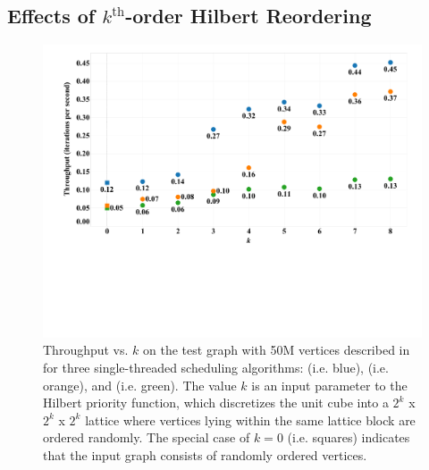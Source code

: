 \subsection{Effects of $k^\textrm{th}$-order Hilbert Reordering}
\label{sec:hilbert_bits}

\begin{figure}[h]
\centering
\includegraphics[width=5in,clip,trim=1cm 6cm 0 0]{figures/scalability_hilbert_bits_serial.pdf}
\caption{Throughput vs. $k$ on the 
test graph with 50M vertices described in 
for three single-threaded scheduling algorithms:  (i.e. blue), 
 (i.e. orange), and  (i.e. green).
The value $k$ is an input parameter to the Hilbert 
priority function, which discretizes the unit cube into
a $2^k$ x $2^k$ x $2^k$ lattice where vertices lying within
the same lattice block are ordered randomly.  The
special case of $k=0$ (i.e. squares) indicates that the input 
graph consists of randomly ordered vertices.
}
\label{fig:scalability_hilbert_bits_serial}
\end{figure}

